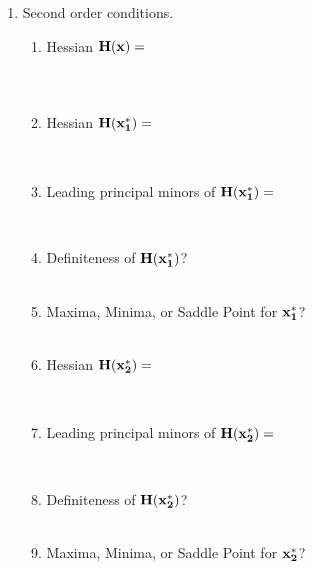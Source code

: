 \documentclass[]{book}
\theoremstyle{definition}
\theoremstyle{definition}
\theoremstyle{definition}
\theoremstyle{remark}
\begin{document}
\begin{enumerate}
  \item Second order conditions.  
    \begin{enumerate}
    \item Hessian $\bf H(x) = $
        $$\phantom{\begin{pmatrix} 6x_1&9\\9&-6x_2 \end{pmatrix}}$$
    \item Hessian $\bf H(x_1^*) = $
        $$\phantom{\begin{pmatrix} 0&9\\9&0\end{pmatrix}}$$
    \item Leading principal minors of $\bf H(x_1^*) = $
        $$\phantom{M_1=0; M_2=-81}$$\\
    \item Definiteness of $\bf H(x_1^*)$?\\
        \phantom{$\bf H(x_1^*)$ is indefinite}\\
    \item Maxima, Minima, or Saddle Point for $\bf x_1^*$?\\
        \\
    \item Hessian $\bf H(x_2^*) = $
        $$\phantom{\begin{pmatrix} 18&9\\9&18\end{pmatrix}}$$
    \item Leading principal minors of $\bf H(x_2^*) = $
        $$\phantom{M_1=18; M_2=243}$$\\
    \item Definiteness of $\bf H(x_2^*)$?\\
        \phantom{$\bf H(x_2^*)$ is positive definite}\\
    \item Maxima, Minima, or Saddle Point for $\bf x_2^*$?\\
        \\
    \end{enumerate}   
    

\end{enumerate}
\end{document}
